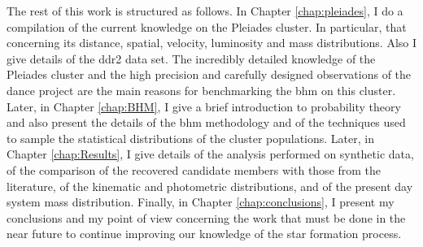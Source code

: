 The rest of this work is structured as follows. In Chapter \ref{chap:pleiades}, I do a compilation of the current knowledge on the Pleiades cluster. In particular, that concerning its distance, spatial, velocity, luminosity and mass distributions. Also I give details of the \gls{ddr2} data set. The incredibly detailed knowledge of the Pleiades cluster and the high precision and carefully designed observations of the \gls{dance} project are the main reasons for benchmarking the \gls{bhm} on this cluster. Later, in Chapter \ref{chap:BHM}, I give a brief introduction to probability theory and also present the details of the \gls{bhm} methodology and of the techniques used to sample the statistical distributions of the cluster populations. Later, in Chapter \ref{chap:Results}, I give details of the analysis performed on synthetic data, of the comparison of the recovered candidate members with those from the literature, of the kinematic and photometric distributions, and of the present day system mass distribution.  Finally, in Chapter \ref{chap:conclusions}, I present my conclusions and my point of view concerning the work that must be done in the near future to continue improving our knowledge of the star formation process.



